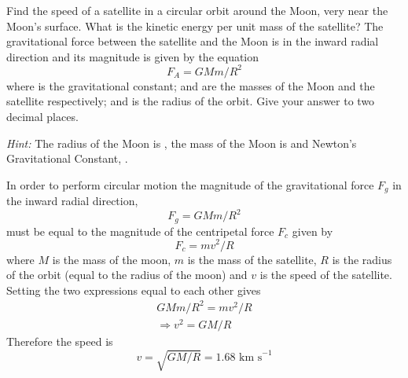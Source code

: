 \begin{problem}
{Find the speed of a satellite in a circular orbit around the Moon, very near the Moon's surface. What is the kinetic energy per unit mass of the satellite?
The gravitational force  between the satellite and the Moon is in the inward radial direction and its magnitude is given by the equation 
\begin{equation*}
F_A=GMm/R^2
\end{equation*}
where  is the gravitational constant;  and  are the masses of the Moon and the satellite respectively; and  is the radius of the orbit. Give your answer to two decimal places.

\emph{Hint:} The radius of the Moon is , the mass of the Moon is  and Newton's Gravitational Constant, .} 
{}
{In order to perform circular motion the magnitude of the gravitational force $F_g$ in the inward radial direction, 
\begin{equation*} F_g=GMm/R^2 \end{equation*}
must be equal to the magnitude of the centripetal force $F_c$ given by 
\begin{equation*} F_c=mv^2/R \end{equation*}
where $M$ is the mass of the moon, $m$ is the mass of the satellite, $R$ is the radius of the orbit (equal to the radius of the moon) and $v$ is the speed of the satellite. Setting the two expressions equal to each other gives
\begin{align*} GMm/R^2=mv^2/R \\ \Rightarrow v^2=GM/R \end{align*}
Therefore the speed is 
\begin{equation*} v=\sqrt{GM/R}=1.68\textrm{ km s}^{-1} \end{equation*} 
}
\end{problem}